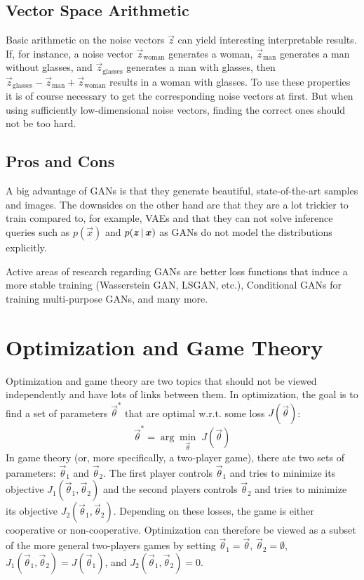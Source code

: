 		\subsection{Vector Space Arithmetic}
			Basic arithmetic on the noise vectors \(\vec{z}\) can yield interesting interpretable results. If, for instance, a noise vector \( \vec{z}_\text{woman} \) generates a woman, \( \vec{z}_\text{man} \) generates a man without glasses, and \( \vec{z}_\text{glasses} \) generates a man with glasses, then \( \vec{z}_\text{glasses} - \vec{z}_\text{man} + \vec{z}_\text{woman} \) results in a woman with glasses. To use these properties it is of course necessary to get the corresponding noise vectors at first. But when using sufficiently low-dimensional noise vectors, finding the correct ones should not be too hard.

		\subsection{Pros and Cons}
			A big advantage of GANs is that they generate beautiful, state-of-the-art samples and images. The downsides on the other hand are that they are a lot trickier to train compared to, for example, VAEs and that they can not solve inference queries such as \( p(\vec{x}) \) and \( p(\bm{z} \,\vert\, \bm{x}) \) as GANs do not model the distributions explicitly.

			Active areas of research regarding GANs are better loss functions that induce a more stable training (Wasserstein GAN, LSGAN, etc.), Conditional GANs for training multi-purpose GANs, and many more.

	\section{Optimization and Game Theory}
		Optimization and game theory are two topics that should not be viewed independently and have lots of links between them. In optimization, the goal is to find a set of parameters \( \vec{\theta}^\ast \) that are optimal w.r.t. some loss \( J(\vec{\theta}) \):
		\begin{equation}
			\vec{\theta}^\ast = \arg\min_{\vec{\theta}} \; J(\vec{\theta})
		\end{equation}
		In game theory (or, more specifically, a two-player game), there ate two sets of parameters: \( \vec{\theta}_1 \) and \( \vec{\theta}_2 \). The first player controls \(\vec{\theta}_1\) and tries to minimize its objective \( J_1(\vec{\theta}_1, \vec{\theta}_2) \) and the second players controls \(\vec{\theta}_2\) and tries to minimize its objective \( J_2(\vec{\theta}_1, \vec{\theta}_2) \). Depending on these losses, the game is either cooperative or non-cooperative. Optimization can therefore be viewed as a subset of the more general two-players games by setting \( \vec{\theta}_1 = \vec{\theta} \), \( \vec{\theta}_2 = \emptyset \), \( J_1(\vec{\theta}_1, \vec{\theta}_2) = J(\vec{\theta}_1) \), and \( J_2(\vec{\theta}_1, \vec{\theta}_2) = 0 \).

